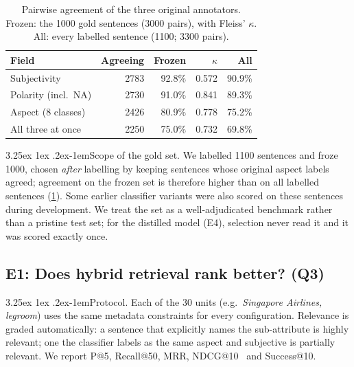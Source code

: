 \documentclass[10pt,twocolumn,a4paper]{article}
\makeatletter
\renewcommand\paragraph{\@startsection{paragraph}{4}{\parindent}%
  {3.25ex \@plus 1ex \@minus .2ex}{-1em}{\normalfont\normalsize\bfseries}}
\makeatother
\begin{document}
\begin{table}[t]
\centering\small
\caption{Pairwise agreement of the three original annotators. Frozen: the \num{1000} gold sentences (\num{3000}
pairs), with Fleiss' $\kappa$. All: every labelled sentence (\num{1100}; \num{3300} pairs).}
\label{tab:agree}
\setlength{\tabcolsep}{4pt}
\begin{tabular}{@{}lrrrr@{}}
\toprule
\textbf{Field} & \textbf{Agreeing} & \textbf{Frozen} & \textbf{$\kappa$} & \textbf{All} \\
\midrule
Subjectivity & \num{2783} & 92.8\% & 0.572 & 90.9\% \\
Polarity (incl.\ NA) & \num{2730} & 91.0\% & 0.841 & 89.3\% \\
Aspect (8 classes) & \num{2426} & 80.9\% & 0.778 & 75.2\% \\
All three at once & \num{2250} & 75.0\% & 0.732 & 69.8\% \\
\bottomrule
\end{tabular}
\end{table}

\paragraph{Scope of the gold set.} We labelled \num{1100} sentences and froze \num{1000}, chosen \emph{after} labelling
by keeping sentences whose original aspect labels agreed; agreement on the frozen set is therefore higher than on
all labelled sentences (\cref{tab:agree}). Some earlier classifier variants were also scored on these sentences during
development. We treat the set as a well-adjudicated benchmark rather than a pristine test set; for the distilled model
(E4), selection never read it and it was scored exactly once.

\subsection{E1: Does hybrid retrieval rank better? (Q3)}
\label{sec:exp-ret}

\paragraph{Protocol.} Each of the 30 units (e.g.\ \emph{Singapore Airlines, legroom}) uses the same metadata constraints
for every configuration. Relevance is graded automatically: a sentence that explicitly names the sub-attribute is highly
relevant; one the classifier labels as the same aspect and subjective is partially relevant. We report P@5, Recall@50,
MRR, NDCG@10~\cite{ndcg} and Success@10.
\end{document}
